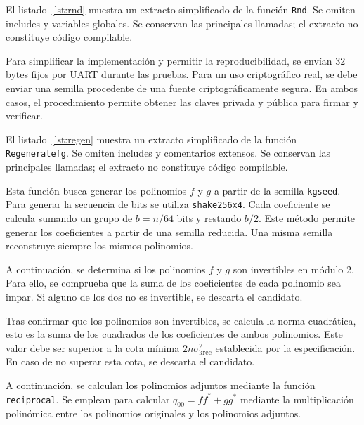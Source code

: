 

El listado~\ref{lst:rnd} muestra un extracto simplificado de la función
\texttt{Rnd}. Se omiten includes y variables globales. 
Se conservan las principales llamadas; el extracto no constituye código compilable.

Para simplificar la implementación y permitir la reproducibilidad, se envían 32 bytes fijos
por UART durante las pruebas. Para un uso criptográfico real, 
se debe enviar una semilla procedente de una fuente criptográficamente segura. 
En ambos casos, el procedimiento permite obtener las 
claves privada y pública para firmar y verificar.



El listado~\ref{lst:regen} muestra un extracto simplificado de la función
\texttt{Regeneratefg}. Se omiten includes y comentarios extensos. 
Se conservan las principales llamadas; el extracto no constituye código compilable.

Esta función busca generar los polinomios $f$ y $g$ a partir de la semilla \texttt{kgseed}.
Para generar la secuencia de bits se utiliza \texttt{shake256x4}.
Cada coeficiente se calcula sumando un grupo de
$b=n/64$ bits y restando $b/2$.
Este método permite generar los coeficientes a partir de una semilla reducida.
Una misma semilla reconstruye siempre los mismos polinomios.

A continuación, se determina si los polinomios $f$ y $g$ son
invertibles en módulo 2. Para ello, se comprueba que la suma de
los coeficientes de cada polinomio sea impar.
Si alguno de los dos no es invertible, se descarta el candidato.

Tras confirmar que los polinomios son invertibles,
se calcula la norma cuadrática, esto es la suma de los cuadrados
de los coeficientes de ambos polinomios. Este valor debe ser
superior a la cota mínima $2n\sigma_{\mathrm{krec}}^2$ establecida
por la especificación. En caso de no superar esta cota, se descarta el candidato.

A continuación, se calculan los polinomios adjuntos mediante la función \texttt{reciprocal}.
Se emplean para calcular $q_{00} = f f^{*} + g g^{*}$ mediante la multiplicación polinómica
entre los polinomios originales y los polinomios adjuntos.

